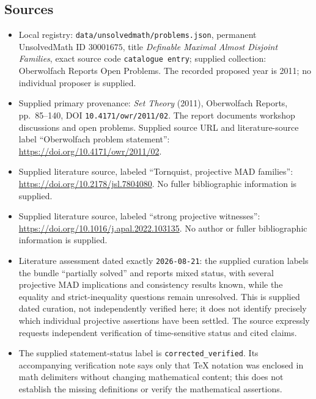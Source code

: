\documentclass[11pt]{article}
\begin{document}
\subsection{Sources}
\begin{itemize}
\item Local registry: \texttt{data/unsolvedmath/problems.json}, permanent UnsolvedMath ID \(30001675\), title \emph{Definable Maximal Almost Disjoint Families}, exact source code \texttt{catalogue entry}; supplied collection: Oberwolfach Reports Open Problems. The recorded proposed year is 2011; no individual proposer is supplied.
\item Supplied primary provenance: \emph{Set Theory} (2011), Oberwolfach Reports, pp.\ 85--140, DOI \texttt{10.4171/owr/2011/02}. The report documents workshop discussions and open problems. Supplied source URL and literature-source label ``Oberwolfach problem statement'': \url{https://doi.org/10.4171/owr/2011/02}.
\item Supplied literature source, labeled ``Tornquist, projective MAD families'': \url{https://doi.org/10.2178/jsl.7804080}. No fuller bibliographic information is supplied.
\item Supplied literature source, labeled ``strong projective witnesses'': \url{https://doi.org/10.1016/j.apal.2022.103135}. No author or fuller bibliographic information is supplied.
\item Literature assessment dated exactly \texttt{2026-08-21}: the supplied curation labels the bundle ``partially solved'' and reports mixed status, with several projective MAD implications and consistency results known, while the equality and strict-inequality questions remain unresolved. This is supplied dated curation, not independently verified here; it does not identify precisely which individual projective assertions have been settled. The source expressly requests independent verification of time-sensitive status and cited claims.
\item The supplied statement-status label is \texttt{corrected\_verified}. Its accompanying verification note says only that TeX notation was enclosed in math delimiters without changing mathematical content; this does not establish the missing definitions or verify the mathematical assertions.
\end{itemize}
\end{document}
